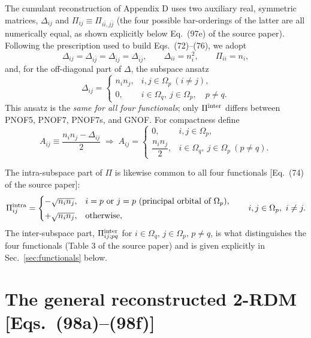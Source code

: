 \documentclass[11pt,a4paper]{article}
\newcommand{\PiMat}{\Pi}
\newcommand{\DeltaMat}{\Delta}
\newcommand{\Om}{\Omega}
\begin{document}
The cumulant reconstruction of Appendix D uses two auxiliary real,
symmetric matrices, $\DeltaMat_{ij}$ and $\PiMat_{ij}\equiv
\PiMat_{i\bar i,j\bar j}$ (the four possible bar-orderings of the
latter are all numerically equal, as shown explicitly below
Eq.~(97e) of the source paper). Following the prescription used to
build Eqs.~(72)--(76), we adopt
\begin{equation}
 \DeltaMat_{ij}=\DeltaMat_{i\bar j}=\DeltaMat_{\bar ij}=\DeltaMat_{\bar i\bar j},
 \qquad
 \DeltaMat_{ii}=n_i^2,
 \qquad
 \PiMat_{ii}=n_i,
 \label{eq:delta-pi-diag}
\end{equation}
and, for the off-diagonal part of $\DeltaMat$, the subspace ansatz
\begin{equation}
 \DeltaMat_{ij}=
 \begin{cases}
 n_i n_j, & i,j\in\Om_p \ (i\neq j),\\[1mm]
 0, & i\in\Om_q,\ j\in\Om_p,\quad p\neq q.
 \end{cases}
 \label{eq:delta-subspaces}
\end{equation}
This ansatz is the \emph{same for all four functionals}; only
$\PiMat^{\rm inter}$ differs between PNOF5, PNOF7, PNOF7s, and GNOF.
For compactness define
\begin{equation}
 A_{ij}\equiv\frac{n_in_j-\DeltaMat_{ij}}{2}
 \;\Longrightarrow\;
 A_{ij}=
 \begin{cases}
 0, & i,j\in\Om_p,\\[1mm]
 \dfrac{n_in_j}{2}, & i\in\Om_q,\ j\in\Om_p\ (p\neq q).
 \end{cases}
 \label{eq:Aij}
\end{equation}

The intra-subspace part of $\PiMat$ is likewise common to all four
functionals [Eq.~(74) of the source paper]:
\begin{equation}
 \PiMat^{\rm intra}_{ij}=
 \begin{cases}
 -\sqrt{n_in_j}, & i=p\ \text{or}\ j=p \ (\text{principal orbital of }\Om_p),\\[1mm]
 +\sqrt{n_in_j}, & \text{otherwise},
 \end{cases}
 \qquad i,j\in\Om_p,\ i\neq j.
 \label{eq:Pi-intra}
\end{equation}
The inter-subspace part, $\PiMat^{\rm inter}_{ij;pq}$ for
$i\in\Om_q,\,j\in\Om_p,\,p\neq q$, is what distinguishes the four
functionals (Table 3 of the source paper) and is given explicitly in
Sec.~\ref{sec:functionals} below.

\section{The general reconstructed 2-RDM [Eqs.~(98a)--(98f)]}
\label{sec:general98}
\end{document}
